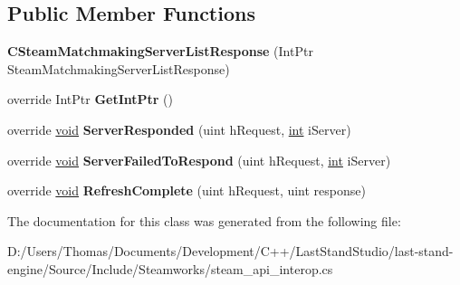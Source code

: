 \subsection*{Public Member Functions}
\begin{DoxyCompactItemize}
\item 
\hypertarget{classValve_1_1Steamworks_1_1CSteamMatchmakingServerListResponse_ae3d3e42fb984c5c1c49567a76898d0fe}{}{\bfseries C\+Steam\+Matchmaking\+Server\+List\+Response} (Int\+Ptr Steam\+Matchmaking\+Server\+List\+Response)\label{classValve_1_1Steamworks_1_1CSteamMatchmakingServerListResponse_ae3d3e42fb984c5c1c49567a76898d0fe}

\item 
\hypertarget{classValve_1_1Steamworks_1_1CSteamMatchmakingServerListResponse_a6d12bc91d6328bef5edd4d6cea2023c9}{}override Int\+Ptr {\bfseries Get\+Int\+Ptr} ()\label{classValve_1_1Steamworks_1_1CSteamMatchmakingServerListResponse_a6d12bc91d6328bef5edd4d6cea2023c9}

\item 
\hypertarget{classValve_1_1Steamworks_1_1CSteamMatchmakingServerListResponse_abc8e9e88179be78287beb2cd9f37050e}{}override \hyperlink{SDL__audio_8h_a52835ae37c4bb905b903cbaf5d04b05f}{void} {\bfseries Server\+Responded} (uint h\+Request, \hyperlink{SDL__thread_8h_a6a64f9be4433e4de6e2f2f548cf3c08e}{int} i\+Server)\label{classValve_1_1Steamworks_1_1CSteamMatchmakingServerListResponse_abc8e9e88179be78287beb2cd9f37050e}

\item 
\hypertarget{classValve_1_1Steamworks_1_1CSteamMatchmakingServerListResponse_aad27f032e8bda7028cd0cafaf8a089f2}{}override \hyperlink{SDL__audio_8h_a52835ae37c4bb905b903cbaf5d04b05f}{void} {\bfseries Server\+Failed\+To\+Respond} (uint h\+Request, \hyperlink{SDL__thread_8h_a6a64f9be4433e4de6e2f2f548cf3c08e}{int} i\+Server)\label{classValve_1_1Steamworks_1_1CSteamMatchmakingServerListResponse_aad27f032e8bda7028cd0cafaf8a089f2}

\item 
\hypertarget{classValve_1_1Steamworks_1_1CSteamMatchmakingServerListResponse_a37f0afb3b90526265d9d2a4b5e011c95}{}override \hyperlink{SDL__audio_8h_a52835ae37c4bb905b903cbaf5d04b05f}{void} {\bfseries Refresh\+Complete} (uint h\+Request, uint response)\label{classValve_1_1Steamworks_1_1CSteamMatchmakingServerListResponse_a37f0afb3b90526265d9d2a4b5e011c95}

\end{DoxyCompactItemize}


The documentation for this class was generated from the following file\+:\begin{DoxyCompactItemize}
\item 
D\+:/\+Users/\+Thomas/\+Documents/\+Development/\+C++/\+Last\+Stand\+Studio/last-\/stand-\/engine/\+Source/\+Include/\+Steamworks/steam\+\_\+api\+\_\+interop.\+cs\end{DoxyCompactItemize}
